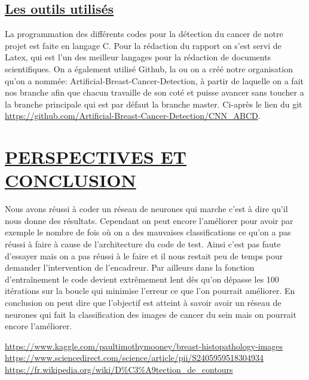 \documentclass[11pt]{article}
\begin{document}
\subsection{\underline{Les outils utilisés}}
La programmation des différents codes pour la détection du cancer de notre projet est faite en langage C. Pour la rédaction du rapport on s'est servi de Latex, qui est l'un des meilleur langages pour la rédaction de documents scientifiques. On a également utilisé Github, la ou on a créé notre organisation qu'on a nommée: Artificial-Breast-Cancer-Detection, à partir de laquelle on a fait nos branche afin que chacun travaille de son coté et puisse avancer sans toucher a la branche principale qui est par défaut la branche master. Ci-après le lien du git \url{https://github.com/Artificial-Breast-Cancer-Detection/CNN_ABCD}.

\section{\underline{PERSPECTIVES ET CONCLUSION}}
Nous avons réussi à coder un réseau de neurones qui marche c'est à dire qu'il nous donne des résultats. Cependant on peut encore l'améliorer pour avoir par exemple le nombre de fois où on a des mauvaises classifications ce qu'on a pas réussi à faire à cause de l'architecture du code de test. Ainsi c'est pas faute d'essayer mais on a pas réussi à le faire et il nous restait peu de temps pour demander l'intervention de l'encadreur. Par ailleurs dans la fonction d’entraînement le code devient extrêmement lent dès qu'on dépasse les 100 itérations sur la boucle qui minimise l'erreur ce que l'on pourrait améliorer. En conclusion on peut dire que l'objectif est atteint à savoir avoir un réseau de neurones qui fait la classification des images de cancer du sein mais on pourrait encore l'améliorer.
\begin{thebibliography}{9}
 \url{https://www.kaggle.com/paultimothymooney/breast-histopathology-images} 
  \url{ https://www.sciencedirect.com/science/article/pii/S2405959518304934} 
  \url{https://fr.wikipedia.org/wiki/D%C3%A9tection_de_contours}
\end{thebibliography}
\end{document}
